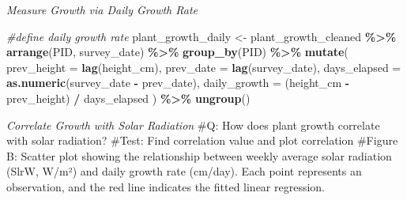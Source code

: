 \documentclass[
]{article}
\newenvironment{Shaded}{\begin{snugshade}}{\end{snugshade}}
\newcommand{\AttributeTok}[1]{\textcolor[rgb]{0.13,0.29,0.53}{#1}}
\newcommand{\CommentTok}[1]{\textcolor[rgb]{0.56,0.35,0.01}{\textit{#1}}}
\newcommand{\DecValTok}[1]{\textcolor[rgb]{0.00,0.00,0.81}{#1}}
\newcommand{\FunctionTok}[1]{\textcolor[rgb]{0.13,0.29,0.53}{\textbf{#1}}}
\newcommand{\NormalTok}[1]{#1}
\newcommand{\OtherTok}[1]{\textcolor[rgb]{0.56,0.35,0.01}{#1}}
\newcommand{\SpecialCharTok}[1]{\textcolor[rgb]{0.81,0.36,0.00}{\textbf{#1}}}
\newcommand{\StringTok}[1]{\textcolor[rgb]{0.31,0.60,0.02}{#1}}
\begin{document}
\emph{Measure Growth via Daily Growth Rate}

\begin{Shaded}
\begin{Highlighting}[]
\CommentTok{\#define daily growth rate}
\NormalTok{plant\_growth\_daily }\OtherTok{\textless{}{-}}\NormalTok{ plant\_growth\_cleaned }\SpecialCharTok{\%\textgreater{}\%}
  \FunctionTok{arrange}\NormalTok{(PID, survey\_date) }\SpecialCharTok{\%\textgreater{}\%}
  \FunctionTok{group\_by}\NormalTok{(PID) }\SpecialCharTok{\%\textgreater{}\%}
  \FunctionTok{mutate}\NormalTok{(}
    \AttributeTok{prev\_height =} \FunctionTok{lag}\NormalTok{(height\_cm),}
    \AttributeTok{prev\_date =} \FunctionTok{lag}\NormalTok{(survey\_date),}
    \AttributeTok{days\_elapsed =} \FunctionTok{as.numeric}\NormalTok{(survey\_date }\SpecialCharTok{{-}}\NormalTok{ prev\_date),}
    \AttributeTok{daily\_growth =}\NormalTok{ (height\_cm }\SpecialCharTok{{-}}\NormalTok{ prev\_height) }\SpecialCharTok{/}\NormalTok{ days\_elapsed}
\NormalTok{  ) }\SpecialCharTok{\%\textgreater{}\%}
  \FunctionTok{ungroup}\NormalTok{()}
\end{Highlighting}
\end{Shaded}

\emph{Correlate Growth with Solar Radiation} \#Q: How does plant growth
correlate with solar radiation? \#Test: Find correlation value and plot
correlation \#Figure B: Scatter plot showing the relationship between
weekly average solar radiation (SlrW, W/m²) and daily growth rate
(cm/day). Each point represents an observation, and the red line
indicates the fitted linear regression.

\begin{Shaded}
\end{Shaded}
\end{document}

